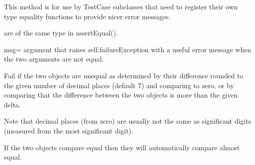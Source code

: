 \documentclass[letterpaper,10pt,english]{sphinxmanual}
\begin{document}
\begin{fulllineitems}
\begin{fulllineitems}
\sphinxAtStartPar
This method is for use by TestCase subclasses that need to register
their own type equality functions to provide nicer error messages.
\begin{description}
\begin{description}
\sphinxAtStartPar
are of the same type in assertEqual().

\sphinxAtStartPar
msg= argument that raises self.failureException with a
useful error message when the two arguments are not equal.

\end{description}

\end{description}

\end{fulllineitems}


\begin{fulllineitems}
\label{\detokenize{_autosummary/tests.test_unit.test_df:tests.test_unit.test_df.assertAlmostEqual}}
\pysigstartsignatures
{}
\pysigstopsignatures
\sphinxAtStartPar
Fail if the two objects are unequal as determined by their
difference rounded to the given number of decimal places
(default 7) and comparing to zero, or by comparing that the
difference between the two objects is more than the given
delta.

\sphinxAtStartPar
Note that decimal places (from zero) are usually not the same
as significant digits (measured from the most significant digit).

\sphinxAtStartPar
If the two objects compare equal then they will automatically
compare almost equal.

\end{fulllineitems}



\end{fulllineitems}
\end{document}
